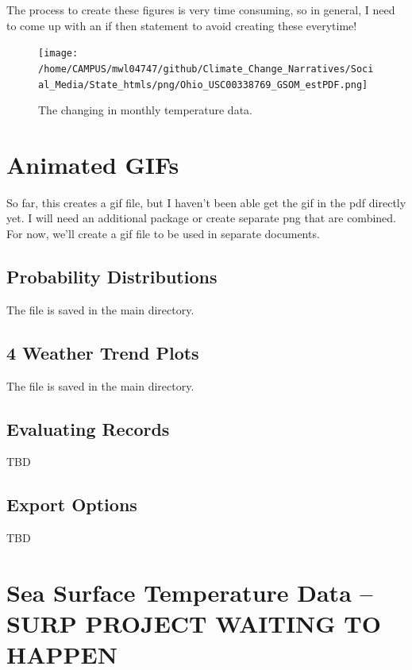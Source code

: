 \documentclass{article}\usepackage[]{graphicx}\usepackage[]{color}
\begin{document}
The process to create these figures is very time consuming, so in general, I need to come up with an if then statement to avoid creating these everytime!

\begin{figure}
\texttt{[image: /home/CAMPUS/mwl04747/github/Climate\_Change\_Narratives/Social\_Media/State\_htmls/png/Ohio\_USC00338769\_GSOM\_estPDF.png]}
\caption{The changing in monthly temperature data.}
\label{fig:GSOM_estPDF}
\end{figure}

\section{Animated GIFs}

So far, this creates a gif file, but I haven't been able get the gif in the pdf directly yet. I will need an additional package or create separate png that are combined. For now, we'll create a gif file to be used in separate documents.

\subsection{Probability Distributions}




The file is saved in the main directory. 


\subsection{4 Weather Trend Plots}




The file is saved in the main directory. 


\subsection{Evaluating Records}

TBD

\subsection{Export Options}

TBD

\section{Sea Surface Temperature Data -- SURP PROJECT WAITING TO HAPPEN}
\end{document}
